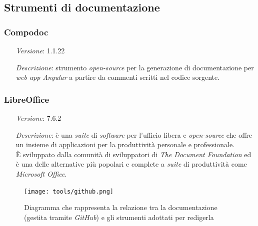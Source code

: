 \subsection{Strumenti di documentazione}

\subsubsection*{Compodoc} %
\begin{itemize}[align=left]
    \item [\textit{Versione}:] 1.1.22
    \item [\textit{Descrizione}:] strumento \textit{open-source} per la generazione di documentazione per \textit{web app Angular} a partire da commenti scritti nel codice sorgente.
\end{itemize}

\subsubsection*{LibreOffice} %
\begin{itemize}[align=left]
    \item [\textit{Versione}:] 7.6.2
    \item [\textit{Descrizione}:] è una \textit{suite} di \textit{software} per l'ufficio libera e \textit{open-source} che offre un insieme di applicazioni per la produttività personale e professionale. \\
                È sviluppato dalla comunità di sviluppatori di \textit{The Document Foundation} ed è una delle alternative più popolari e complete a \textit{suite} di produttività come \textit{Microsoft Office}.
\end{itemize}

\begin{figure}[H]
  \centering
  \texttt{[image: tools/github.png]}
  \caption[Diagramma degli strumenti di documentazione]{Diagramma che rappresenta la relazione tra la documentazione (gestita tramite \textit{GitHub}) e gli strumenti adottati per redigerla}
\end{figure}
